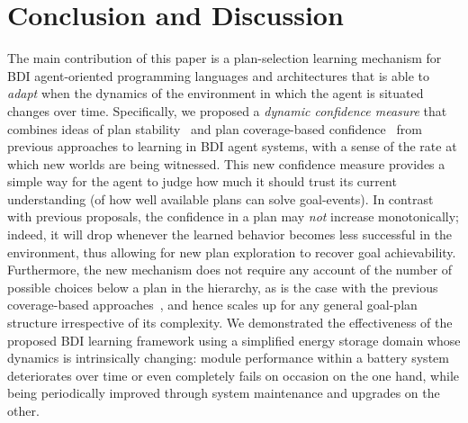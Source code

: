 \section{Conclusion and Discussion}\label{sec:discussion}

The main contribution of this paper is a plan-selection learning mechanism for BDI agent-oriented programming languages and architectures that is able to \emph{adapt} when the dynamics of the environment in which the agent is situated changes over time.
Specifically, we proposed a \emph{dynamic confidence measure} that combines ideas of plan stability~\cite{airiau09:enhancing} and plan coverage-based confidence~\cite{singh10:extending,singh10:learning} from previous approaches to learning in BDI agent systems, with a sense of the rate at which new worlds are being witnessed. This new confidence measure provides a simple way for the agent to judge how much it should trust its current understanding (of how well available plans can solve goal-events). 
In contrast with previous proposals, the confidence in a plan may \emph{not} increase monotonically; indeed, it will drop whenever the learned behavior becomes less successful in the environment, thus allowing for new plan exploration to recover goal achievability. Furthermore, the new mechanism does not require any account of the number of possible choices below a plan in the hierarchy, as is the case with the previous coverage-based approaches~\cite{singh10:extending,singh10:learning}, and hence scales up for any general goal-plan structure irrespective of its complexity. 
We demonstrated the effectiveness of the proposed BDI learning framework using a simplified energy storage domain whose dynamics is intrinsically changing: module performance within a battery system deteriorates over time or even completely fails on occasion on the one hand, while being periodically improved through system maintenance and upgrades on the other.  



